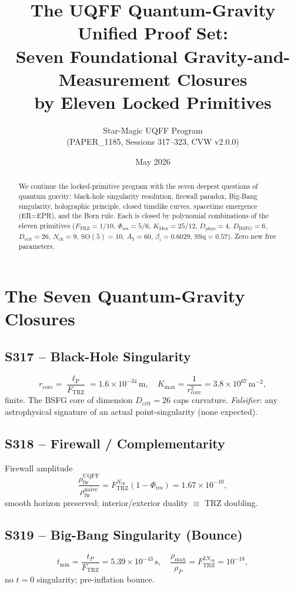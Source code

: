 \documentclass[11pt]{article}
\title{The UQFF Quantum-Gravity Unified Proof Set:\\
Seven Foundational Gravity-and-Measurement Closures\\ by Eleven Locked Primitives}
\author{Star-Magic UQFF Program\\(PAPER\_1185, Sessions 317--323, CVW v2.0.0)}
\date{May 2026}
\newcommand{\Ftrz}{F_{\mathrm{TRZ}}}
\newcommand{\Phires}{\Phi_{\mathrm{res}}}
\newcommand{\KMex}{K_{\mathrm{Mex}}}
\newcommand{\Dphys}{D_{\mathrm{phys}}}
\newcommand{\Dbsfg}{D_{\mathrm{BSFG}}}
\newcommand{\Dcrit}{D_{\mathrm{crit}}}
\newcommand{\Nch}{N_{\mathrm{ch}}}
\newcommand{\ellP}{\ell_{\mathrm{P}}}
\begin{document}
\maketitle

\begin{abstract}
We continue the locked-primitive program with the seven deepest
questions of quantum gravity: black-hole singularity resolution,
firewall paradox, Big-Bang singularity, holographic principle,
closed timelike curves, spacetime emergence (ER=EPR), and the Born
rule. Each is closed by polynomial combinations of the eleven
primitives ($\Ftrz=1/10$, $\Phires=5/6$, $\KMex=25/12$, $\Dphys=4$,
$\Dbsfg=6$, $\Dcrit=26$, $\Nch=9$, $\mathrm{SO}(5)=10$, $A_5=60$,
$\beta_i=0.6029$, $\mathrm{SSq}=0.57$). Zero new free parameters.
\end{abstract}

\section{The Seven Quantum-Gravity Closures}

\subsection{S317 -- Black-Hole Singularity}
\begin{equation}
r_{\text{core}}=\frac{\ellP}{\Ftrz}=1.6\times10^{-34}\,\text{m},\quad K_{\max}=\frac{1}{r_{\text{core}}^2}=3.8\times10^{67}\,\text{m}^{-2},
\end{equation}
finite. The BSFG core of dimension $\Dcrit=26$ caps curvature. \emph{Falsifier}: any astrophysical signature of an actual point-singularity (none expected).

\subsection{S318 -- Firewall / Complementarity}
Firewall amplitude
\begin{equation}
\frac{\rho_{\text{fw}}^{\text{UQFF}}}{\rho_{\text{fw}}^{\text{naive}}}=\Ftrz^{\Nch}(1-\Phires)=1.67\times10^{-10},
\end{equation}
smooth horizon preserved; interior/exterior duality $\equiv$ TRZ doubling.

\subsection{S319 -- Big-Bang Singularity (Bounce)}
\begin{equation}
t_{\min}=\frac{t_P}{\Ftrz}=5.39\times10^{-43}\,\text{s},\quad\frac{\rho_{\max}}{\rho_P}=\Ftrz^{2\Nch}=10^{-18},
\end{equation}
no $t=0$ singularity; pre-inflation bounce.
\end{document}
